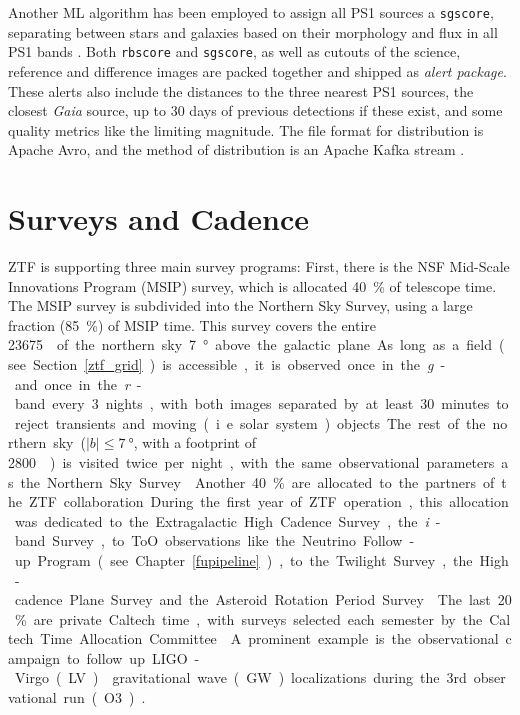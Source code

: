 Another ML algorithm has been employed to assign all PS1 sources a \texttt{sgscore}, separating between stars and galaxies based on their morphology and flux in all PS1 bands . Both \texttt{rbscore} and \texttt{sgscore}, as well as cutouts of the science, reference and difference images are packed together and shipped as \textit{alert package}. These alerts also include the distances to the three nearest PS1 sources, the closest \textit{Gaia} source, up to 30 days of previous detections if these exist, and some quality metrics like the limiting magnitude. The file format for distribution is Apache Avro, and the method of distribution is an Apache Kafka stream .

\section{Surveys and Cadence}
ZTF is supporting three main survey programs: First, there is the NSF Mid-Scale Innovations Program (MSIP) survey, which is allocated \SI{40}{\percent} of telescope time. The MSIP survey is subdivided into the Northern Sky Survey, using a large fraction (\SI{85}{\percent}) of MSIP time. This survey covers the entire \SI{23675}{\square\deg} of the northern sky \SI{7}{\degree} above the galactic plane. As long as a field (see Section \ref{ztf_grid}) is accessible, it is observed once in the \textit{g}- and once in the \textit{r}-band every 3 nights, with both images separated by at least 30 minutes to reject transients and moving (i.e. solar system) objects. The rest of the northern sky ($|b|\leq \SI{7}{\degree}$, with a footprint of \SI{2800}{\square\deg}) is visited twice per night, with the same observational parameters as the Northern Sky Survey \cite{Bellm2019a}.

Another \SI{40}{\percent} are allocated to the partners of the ZTF collaboration. During the first year of ZTF operation, this allocation was dedicated to the Extragalactic High Cadence Survey, the \textit{i}-band Survey, to ToO observations like the Neutrino Follow-up Program (see Chapter \ref{fupipeline}), to the Twilight Survey, the High-cadence Plane Survey and the Asteroid Rotation Period Survey \cite{Bellm2019a}.

The last \SI{20}{\percent} are private Caltech time, with surveys selected each semester by the Caltech Time Allocation Committee \cite{Bellm2019a}. A prominent example is the observational campaign to follow up 
LIGO-Virgo (LV)  gravitational wave (GW) localizations during the 3rd observational run (O3) .

